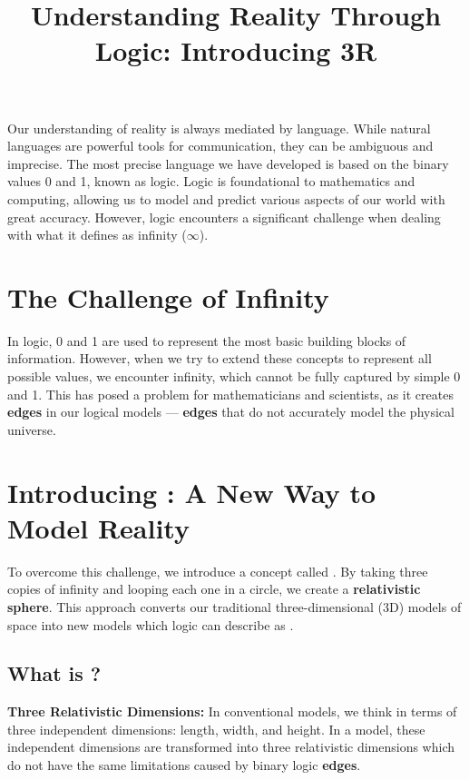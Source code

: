 \documentclass{article}
\title{Understanding Reality Through Logic: Introducing 3R}
\date{}
\begin{document}
\maketitle

Our understanding of reality is always mediated by language. While natural languages are powerful tools for communication, they can be ambiguous and imprecise. The most precise language we have developed is based on the binary values 0 and 1, known as logic. Logic is foundational to mathematics and computing, allowing us to model and predict various aspects of our world with great accuracy. However, logic encounters a significant challenge when dealing with what it defines as infinity (\(\infty\)).

\section*{The Challenge of Infinity}

In logic, 0 and 1 are used to represent the most basic building blocks of information. However, when we try to extend these concepts to represent all possible values, we encounter infinity, which cannot be fully captured by simple 0 and 1. This has posed a problem for mathematicians and scientists, as it creates \textbf{edges} in our logical models — \textbf{edges} that do not accurately model the physical universe.

\section*{Introducing \iR{}: A New Way to Model Reality}

To overcome this challenge, we introduce a concept called \iR{}. By taking three copies of infinity and looping each one in a circle, we create a \textbf{relativistic sphere}. This approach converts our traditional three-dimensional (3D) models of space into new models which logic can describe as \iR{}.

\subsection*{What is \iR{}?}

\hspace*{\parindent}\textbf{Three Relativistic Dimensions:}
In conventional models, we think in terms of three independent dimensions: length, width, and height. In a \iR{} model, these independent dimensions are transformed into three relativistic dimensions which do not have the same limitations caused by binary logic \textbf{edges}.
\end{document}
